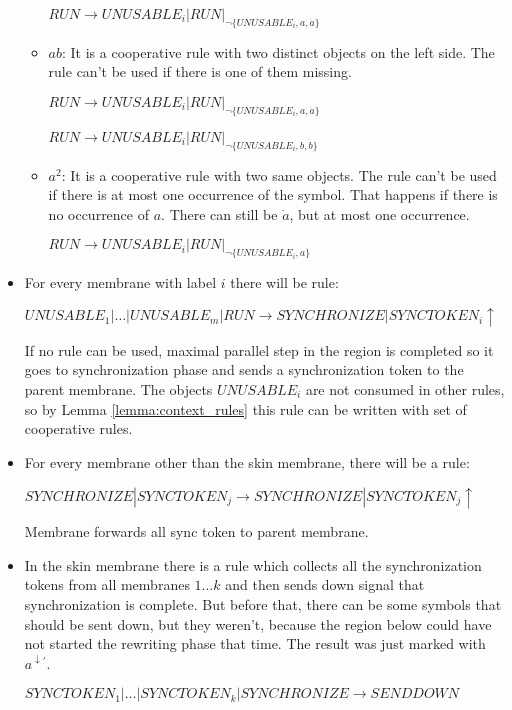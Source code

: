 \begin{dokaz}
\begin{itemize}
\begin{itemize}
      $RUN \rightarrow UNUSABLE_i|RUN|_{\neg\{UNUSABLE_i, a, \dot{a}\}}$

      \item $ab$: It is a cooperative rule with two distinct objects on the left side. The rule can't be used if there is one of them missing.

      $RUN \rightarrow UNUSABLE_i|RUN|_{\neg\{UNUSABLE_i, a, \dot{a}\}}$

      $RUN \rightarrow UNUSABLE_i|RUN|_{\neg\{UNUSABLE_i, b, \dot{b}\}}$

      \item $a^2$: It is a cooperative rule with two same objects. The rule can't be used if there is at most one occurrence of the symbol. That happens if there is no occurrence of $a$. There can still be $\dot{a}$, but at most one occurrence.

      $RUN \rightarrow UNUSABLE_i|RUN|_{\neg\{UNUSABLE_i, a\}}$
    \end{itemize}

    

    \item For every membrane with label $i$ there will be rule:

    $UNUSABLE_1|\dots|UNUSABLE_m|RUN \rightarrow SYNCHRONIZE|SYNCTOKEN_i\uparrow$

    If no rule can be used, maximal parallel step in the region is completed so it goes to synchronization phase and sends a synchronization token to the parent membrane. The objects $UNUSABLE_i$ are not consumed in other rules, so by Lemma \ref{lemma:context_rules} this rule can be written with set of cooperative rules.

    \item For every membrane other than the skin membrane, there will be a rule:

    $SYNCHRONIZE|SYNCTOKEN_j \rightarrow SYNCHRONIZE|SYNCTOKEN_j\uparrow$

    Membrane forwards all sync token to parent membrane.

    \item In the skin membrane there is a rule which collects all the synchronization tokens from all membranes $1\dots k$ and then sends down signal that synchronization is complete. But before that, there can be some symbols that should be sent down, but they weren't, because the region below could have not started the rewriting phase that time. The result was just marked with $a^{\downarrow\prime}$.

    $SYNCTOKEN_1|\dots|SYNCTOKEN_k|SYNCHRONIZE \rightarrow SENDDOWN$


\end{itemize}
\end{dokaz}
